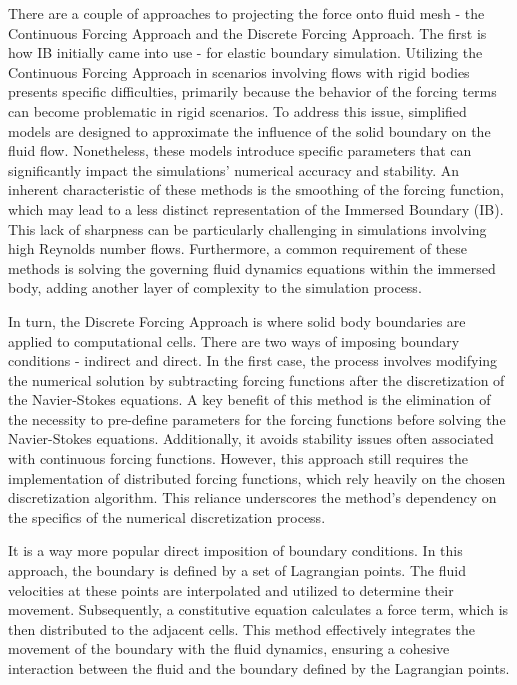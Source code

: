 There are a couple of approaches to projecting the force onto fluid mesh - the Continuous Forcing Approach and the Discrete Forcing Approach. The first is how IB initially came into use - for elastic boundary simulation. Utilizing the Continuous Forcing Approach in scenarios involving flows with rigid bodies presents specific difficulties, primarily because the behavior of the forcing terms can become problematic in rigid scenarios. To address this issue, simplified models are designed to approximate the influence of the solid boundary on the fluid flow. Nonetheless, these models introduce specific parameters that can significantly impact the simulations' numerical accuracy and stability. An inherent characteristic of these methods is the smoothing of the forcing function, which may lead to a less distinct representation of the Immersed Boundary (IB). This lack of sharpness can be particularly challenging in simulations involving high Reynolds number flows. Furthermore, a common requirement of these methods is solving the governing fluid dynamics equations within the immersed body, adding another layer of complexity to the simulation process. 

In turn, the Discrete Forcing Approach is where solid body boundaries are applied to computational cells. There are two ways of imposing boundary conditions - indirect and direct. In the first case, the process involves modifying the numerical solution by subtracting forcing functions after the discretization of the Navier-Stokes equations. A key benefit of this method is the elimination of the necessity to pre-define parameters for the forcing functions before solving the Navier-Stokes equations. Additionally, it avoids stability issues often associated with continuous forcing functions. However, this approach still requires the implementation of distributed forcing functions, which rely heavily on the chosen discretization algorithm. This reliance underscores the method's dependency on the specifics of the numerical discretization process.

It is a way more popular direct imposition of boundary conditions. In this approach, the boundary is defined by a set of Lagrangian points. The fluid velocities at these points are interpolated and utilized to determine their movement. Subsequently, a constitutive equation calculates a force term, which is then distributed to the adjacent cells. This method effectively integrates the movement of the boundary with the fluid dynamics, ensuring a cohesive interaction between the fluid and the boundary defined by the Lagrangian points. 

